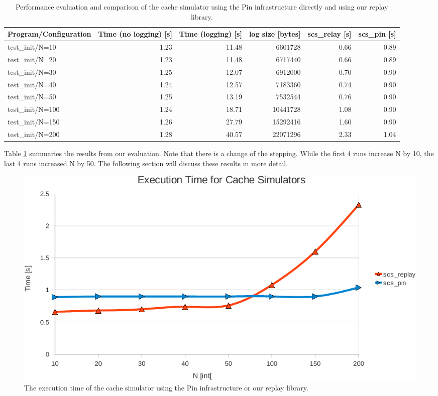 \begin{table}
  \begin{tabularx}{\textwidth}{X r r r r r}
    \toprule
    Program/Configuration & Time (no logging) [s] & Time (logging) [s] & log size [bytes] & scs\_relay [s] & scs\_pin [s]\\
    \midrule
    \addlinespace[1mm]
    \rowcolor[gray]{.9}
    test\_init/N=10   & 1.23 & 11.48 &  6601728 & 0.66 & 0.89 \\
    \addlinespace[1mm]
    test\_init/N=20   & 1.23 & 11.48 &  6717440 & 0.66 & 0.89 \\ 
    \addlinespace[1mm]
    \rowcolor[gray]{.9}
    test\_init/N=30   & 1.25 & 12.07 &  6912000 & 0.70 & 0.90 \\
    \addlinespace[1mm]
    test\_init/N=40   & 1.24 & 12.57 &  7183360 & 0.74 & 0.90 \\
    \addlinespace[1mm]
    \rowcolor[gray]{.9}
    test\_init/N=50   & 1.25 & 13.19 &  7532544 & 0.76 & 0.90 \\
    \addlinespace[1mm]
    test\_init/N=100  & 1.24 & 18.71 & 10441728 & 1.08 & 0.90 \\
    \addlinespace[1mm]
    \rowcolor[gray]{.9}
    test\_init/N=150  & 1.26 & 27.79 & 15292416 & 1.60 & 0.90 \\
    \addlinespace[1mm]
    test\_init/N=200  & 1.28 & 40.57 & 22071296 & 2.33 & 1.04 \\
    \bottomrule
  \end{tabularx}
  \caption{Performance evaluation and comparison of the cache
    simulator using the Pin infrastructure directly and using our
    replay library.}
  \label{tbl:results}
\end{table}

Table \ref{tbl:results} summaries the results from our
evaluation. Note that there is a change of the stepping. While the
first 4 runs increase N by 10, the last 4 runs increased N by 50. The
following section will discuss these results in more detail.

\begin{figure}
  \includegraphics[width=\columnwidth]{eval_execution_time_replay}
  \caption{The execution time of the cache simulator using the Pin
    infrastructure or our replay library.}
  \label{fig:eval_execution_time_replay}
\end{figure}

